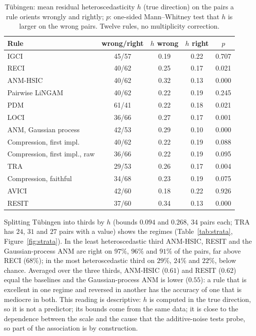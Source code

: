 \begin{table}[t]
\caption{T\"ubingen: mean residual heteroscedasticity $h$ (true direction) on the pairs a rule orients wrongly and rightly; $p$: one-sided Mann--Whitney test that $h$ is larger on the wrong pairs. Twelve rules, no multiplicity correction.}
\label{tab:h2}
\small
\begin{tabular}{@{}lcccc@{}}
\toprule
Rule & wrong/right & $h$ wrong & $h$ right & $p$\\
\midrule
IGCI & 45/57 & 0.19 & 0.22 & 0.707\\
RECI & 40/62 & 0.25 & 0.17 & 0.021\\
ANM-HSIC & 40/62 & 0.32 & 0.13 & 0.000\\
Pairwise LiNGAM & 40/62 & 0.22 & 0.19 & 0.245\\
PDM & 61/41 & 0.22 & 0.18 & 0.021\\
LOCI & 36/66 & 0.27 & 0.17 & 0.001\\
ANM, Gaussian process & 42/53 & 0.29 & 0.10 & 0.000\\
Compression, first impl. & 40/62 & 0.22 & 0.19 & 0.088\\
Compression, first impl., raw & 36/66 & 0.22 & 0.19 & 0.095\\
TRA & 29/53 & 0.26 & 0.17 & 0.004\\
Compression, faithful & 34/68 & 0.23 & 0.19 & 0.075\\
AVICI & 42/60 & 0.18 & 0.22 & 0.926\\
RESIT & 37/60 & 0.34 & 0.13 & 0.000\\
\bottomrule
\end{tabular}
\end{table}

Splitting T\"ubingen into thirds by $h$ (bounds $0.094$ and $0.268$, $34$ pairs each; TRA has $24$, $31$ and $27$ pairs with a value) shows the regimes (Table~\ref{tab:strata}, Figure~\ref{fig:strata}). In the least heteroscedastic third ANM-HSIC, RESIT and the Gaussian-process ANM are right on $97\%$, $96\%$ and $91\%$ of the pairs, far above RECI ($68\%$); in the most heteroscedastic third on $29\%$, $24\%$ and $22\%$, below chance. Averaged over the three thirds, ANM-HSIC ($0.61$) and RESIT ($0.62$) equal the baselines and the Gaussian-process ANM is lower ($0.55$): a rule that is excellent in one regime and reversed in another has the accuracy of one that is mediocre in both. This reading is descriptive: $h$ is computed in the true direction, so it is not a predictor; its bounds come from the same data; it is close to the dependence between the scale and the cause that the additive-noise tests probe, so part of the association is by construction.

